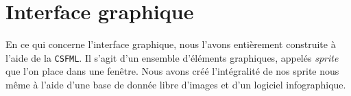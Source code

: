 \section*{Interface graphique}

	En ce qui concerne l'interface graphique, nous l'avons entièrement construite à l'aide de la \texttt{CSFML}. Il s'agit d'un ensemble d'éléments graphiques, appelés \textit{sprite} que l'on place dans une fenêtre. Nous avons créé l'intégralité de nos sprite nous même à l'aide d'une base de donnée libre d'images et d'un logiciel infographique. 
\vspace{0.5cm}

\vspace{0.5cm}


